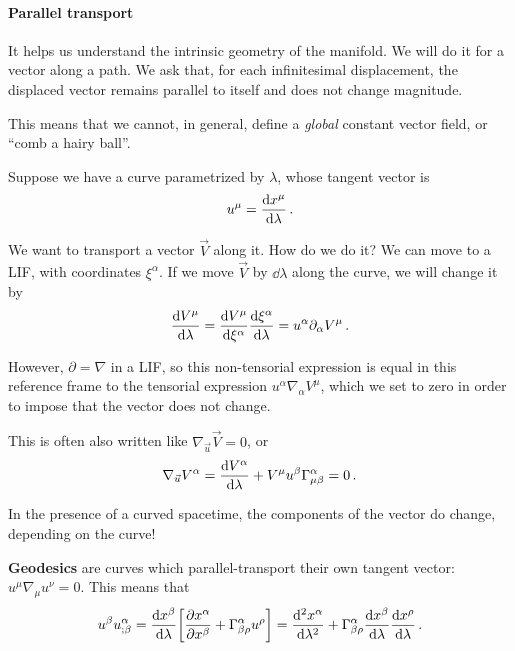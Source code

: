 \documentclass[main.tex]{subfiles}
\begin{document}
\paragraph{Parallel transport}

It helps us understand the intrinsic geometry of the manifold. 
We will do it for a vector along a path. 
We ask that, for each infinitesimal displacement, the displaced vector remains parallel to itself and does not change magnitude.

This means that we cannot, in general, define a \emph{global} constant vector field, or ``comb a hairy ball''. 

Suppose we have a curve parametrized by \(\lambda \), whose tangent vector is 
%
\begin{align}
u^{\mu } = \dv{x^{\mu }}{\lambda }
\,.
\end{align}

We want to transport a vector \(\vec{V}\) along it. 
How do we do it? We can move to a LIF, with coordinates \(\xi^{\alpha }\). 
If we move \(\vec{V}\) by \(\dd{\lambda }\) along the curve, we will change it by 
%
\begin{align}
\dv{V^{\mu }}{\lambda } = \dv{V^{\mu }}{\xi^{\alpha }} \dv{\xi^{\alpha }}{\lambda } = u^{\alpha }\partial_{\alpha } V^{\mu }
\,.
\end{align}

However, \(\partial = \nabla\) in a LIF, so this non-tensorial expression is equal in this reference frame to the tensorial expression \(u^{\alpha } \nabla_\alpha V^{\mu }\), which we set to zero in order to impose that the vector does not change.

This is often also written like \(\nabla_{\vec{u}} \vec{V} = 0\), or 
%
\begin{align}
\nabla_{\vec{u}} V^{\alpha } = \dv{V^{\alpha }}{\lambda } + V^{\mu } u^{\beta } \Gamma^{\alpha }_{\mu \beta } = 0
\,.
\end{align}

In the presence of a curved spacetime, the components of the vector do change, depending on the curve! 

\textbf{Geodesics} are curves which parallel-transport their own tangent vector: \(u^{\mu } \nabla_{\mu } u^{\nu } = 0\). 
This means that 
%
\begin{align}
u^{\beta } u^{\alpha }_{; \beta } = \dv{x^{\beta }}{\lambda } \qty[ \pdv{x^{\alpha }}{x^{\beta }} + \Gamma^{\alpha }_{\beta \rho } u^{\rho }] = \dv[2]{x^{\alpha }}{\lambda }
+ \Gamma^{\alpha }_{\beta \rho } \dv{x^{\beta }}{\lambda } \dv{x^{\rho }}{\lambda  }
\,.
\end{align}
\end{document}
